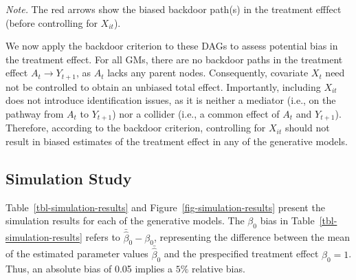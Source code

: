 \documentclass[
  11pt,
  a4paper,
]{article}
\begin{document}
\emph{Note.} The red arrows show the biased backdoor path(s) in the
treatment efffect (before controlling for \(X_{it}\)).

\vspace{2em}

We now apply the backdoor criterion to these DAGs to assess potential
bias in the treatment effect. For all GMs, there are no backdoor paths
in the treatment effect \(A_t \to Y_{t+1}\), as \(A_t\) lacks any parent
nodes. Consequently, covariate \(X_t\) need not be controlled to obtain
an unbiased total effect. Importantly, including \(X_{it}\) does not
introduce identification issues, as it is neither a mediator (i.e., on
the pathway from \(A_t\) to \(Y_{t+1}\)) nor a collider (i.e., a common
effect of \(A_t\) and \(Y_{t+1}\)). Therefore, according to the backdoor
criterion, controlling for \(X_{it}\) should not result in biased
estimates of the treatment effect in any of the generative models.

\subsection{Simulation Study}\label{simulation-study}

Table~\ref{tbl-simulation-results} and
Figure~\ref{fig-simulation-results} present the simulation results for
each of the generative models. The \(\beta_0\) bias in
Table~\ref{tbl-simulation-results} refers to
\(\bar{\hat{\beta}}_{0} - \beta_{0}\), representing the difference
between the mean of the estimated parameter values
\(\bar{\hat{\beta}}_{0}\) and the prespecified treatment effect
\(\beta_{0} = 1\). Thus, an absolute bias of 0.05 implies a \(5\%\)
relative bias.
\end{document}
